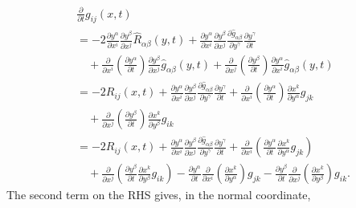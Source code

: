 \begin{align*}
&\frac{\partial}{\partial t}g_{ij}(x,t) \\
&  =-2\frac{\partial y^\alpha}{\partial x^i}\frac{\partial
y^\beta}{\partial x^j}\hat{R}_{\alpha\beta}(y,t)+\frac{\partial
y^\alpha}{\partial x^i}\frac{\partial y^\beta}{\partial
x^j}\frac{\partial \hat{g}_{\alpha\beta}}{\partial
y^\gamma}\frac{\partial y^\gamma}{\partial t}\\
&\quad +\frac{\partial}{\partial x^i}\left(\frac{\partial
y^\alpha}{\partial t}\right)\frac{\partial y^\beta}{\partial
x^j}\hat{g}_{\alpha\beta}(y,t)+\frac{\partial}{\partial
x^j}\left(\frac{\partial y^\beta}{\partial t}\right)\frac{\partial
y^\alpha}{\partial x^i}\hat{g}_{\alpha\beta}(y,t)\\
&  = -2R_{ij}(x,t)+\frac{\partial y^\alpha}{\partial
x^i}\frac{\partial y^\beta}{\partial x^j}\frac{\partial
\hat{g}_{\alpha\beta}}{\partial y^\gamma}\frac{\partial
y^\gamma}{\partial t}+\frac{\partial}{\partial
x^i}\left(\frac{\partial y^\alpha}{\partial
t}\right)\frac{\partial x^k}{\partial
y^\alpha}g_{jk} \\
&\quad+\frac{\partial}{\partial x^j}\left(\frac{\partial
y^\beta}{\partial t}\right)\frac{\partial x^k}{\partial
y^\beta}g_{ik}\\
&  = -2R_{ij}(x,t)+\frac{\partial y^\alpha}{\partial
x^i}\frac{\partial y^\beta}{\partial x^j}\frac{\partial
\hat{g}_{\alpha\beta}}{\partial y^\gamma}\frac{\partial
y^\gamma}{\partial t}+\frac{\partial}{\partial
x^i}\left(\frac{\partial y^\alpha}{\partial t}\frac{\partial
x^k}{\partial
y^\alpha}g_{jk}\right) \\
&\quad+\frac{\partial}{\partial x^j}\left(\frac{\partial
y^\beta}{\partial t}\frac{\partial x^k}{\partial
y^\beta}g_{ik}\right)%
-\frac{\partial y^\alpha}{\partial t}\frac{\partial}{\partial
x^i}\left(\frac{\partial x^k}{\partial
y^\alpha}\right)g_{jk}-\frac{\partial y^\beta}{\partial
t}\frac{\partial}{\partial x^j}\left(\frac{\partial x^k}{\partial
y^\beta}\right)g_{ik}.
\end{align*}
The second term on the RHS gives, in the normal coordinate,
